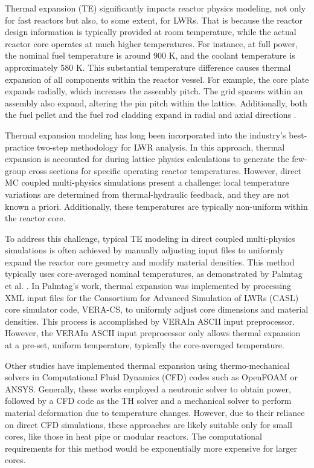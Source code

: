 Thermal expansion (TE) significantly impacts reactor physics modeling, not only for fast reactors but also, to some extent, for LWRs. That is because the reactor design information is typically provided at room temperature, while the actual reactor core operates at much higher temperatures. For instance, at full power, the nominal fuel temperature is around 900 K, and the coolant temperature is approximately 580 K. This substantial temperature difference causes thermal expansion of all components within the reactor vessel. For example, the core plate expands radially, which increases the assembly pitch. The grid spacers within an assembly also expand, altering the pin pitch within the lattice. Additionally, both the fuel pellet and the fuel rod cladding expand in radial and axial directions \cite{palmtag}.

Thermal expansion modeling has long been incorporated into the industry's best-practice two-step methodology for LWR analysis. In this approach, thermal expansion is accounted for during lattice physics calculations to generate the few-group cross sections for specific operating reactor temperatures. However, direct MC coupled multi-physics simulations present a challenge: local temperature variations are determined from thermal-hydraulic feedback, and they are not known a priori. Additionally, these temperatures are typically non-uniform within the reactor core.

To address this challenge, typical TE modeling in direct coupled multi-physics simulations is often achieved by manually adjusting input files to uniformly expand the reactor core geometry and modify material densities. This method typically uses core-averaged nominal temperatures, as demonstrated by Palmtag et al. \cite{palmtag}. In Palmtag's work, thermal expansion was implemented by processing XML input files for the Consortium for Advanced Simulation of LWRs (CASL) core simulator code, VERA-CS, to uniformly adjust core dimensions and material densities. This process is accomplished by VERAIn ASCII input preprocessor. However, the VERAIn ASCII input preprocessor only allows thermal expansion at a pre-set, uniform temperature, typically the core-averaged temperature.

Other studies \cite{fiorina,ma_2021,guo} have implemented thermal expansion using thermo-mechanical solvers in Computational Fluid Dynamics (CFD) codes such as OpenFOAM or ANSYS. Generally, these works employed a neutronic solver to obtain power, followed by a CFD code as the TH solver and a mechanical solver to perform material deformation due to temperature changes. However, due to their reliance on direct CFD simulations, these approaches are likely suitable only for small cores, like those in heat pipe or modular reactors. The computational requirements for this method would be exponentially more expensive for larger cores.

